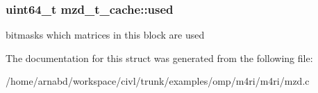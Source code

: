 \subsubsection[{used}]{\setlength{\rightskip}{0pt plus 5cm}uint64\+\_\+t mzd\+\_\+t\+\_\+cache\+::used}\label{structmzd__t__cache_a06d198f654e655c6c59801676aa1bd39}
bitmasks which matrices in this block are used 

The documentation for this struct was generated from the following file\+:\begin{DoxyCompactItemize}
\item 
/home/arnabd/workspace/civl/trunk/examples/omp/m4ri/m4ri/mzd.\+c\end{DoxyCompactItemize}
